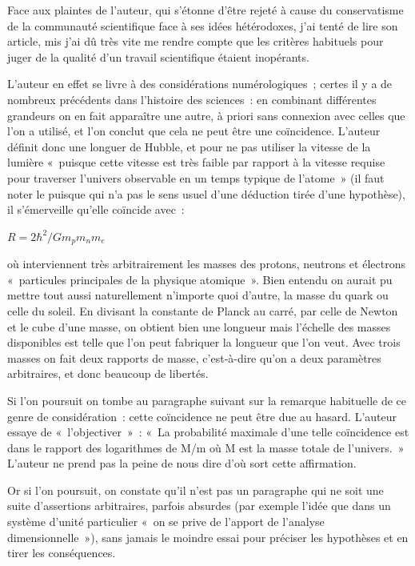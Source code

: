 \documentclass[a4paper,12pt]{article}
\begin{document}
Face aux plaintes de l’auteur, qui s'étonne d’être rejeté à cause du conservatisme de la communauté scientifique face à ses idées hétérodoxes, j’ai tenté de lire son article, mis j’ai dû très vite me rendre compte que les critères habituels pour juger de la qualité d’un travail scientifique étaient inopérants.

L’auteur en effet se livre à des considérations numérologiques ; certes il y a de nombreux précédents dans l’histoire des sciences : en combinant différentes grandeurs on en fait apparaître une autre, à priori sans connexion avec celles que l’on a utilisé, et l’on conclut que cela ne peut être une coïncidence. L’auteur définit donc une longuer de Hubble, et pour ne pas utiliser la vitesse de la lumière « puisque cette vitesse est très faible par rapport à la vitesse requise pour traverser l’univers observable en un temps typique de l’atome » (il faut noter le puisque qui n’a pas le sens usuel d’une déduction tirée d’une hypothèse), il s’émerveille qu’elle coïncide avec :

 $R = 2 \hbar^2/Gm_pm_nm_e$

où interviennent très arbitrairement les masses des protons, neutrons et électrons « particules principales de la physique atomique ». Bien entendu on aurait pu mettre tout aussi naturellement n’importe quoi d’autre, la masse du quark ou celle du soleil. En divisant la constante de Planck au carré, par celle de Newton et le cube d’une masse, on obtient bien une longueur mais l’échelle des masses disponibles est telle que l’on peut fabriquer la longueur que l’on veut. Avec trois masses on fait deux rapports de masse, c’est-à-dire qu’on a deux paramètres arbitraires, et donc beaucoup de libertés.

Si l’on poursuit on tombe au paragraphe suivant sur la remarque habituelle de ce genre de considération : cette coïncidence ne peut être due au hasard. L’auteur essaye de « l’objectiver » : « La probabilité maximale d’une telle coïncidence est dans  le rapport des logarithmes de M/m où M est la masse totale de l’univers. » L’auteur ne prend pas la peine de nous dire d’où sort cette affirmation.

Or si l’on poursuit, on constate qu’il n’est pas un paragraphe qui ne soit une suite d’assertions arbitraires, parfois absurdes (par exemple l’idée que dans un système d’unité particulier « on se prive de l’apport de l’analyse dimensionnelle »), sans jamais le moindre essai pour préciser les hypothèses et en tirer les conséquences.
\end{document}

